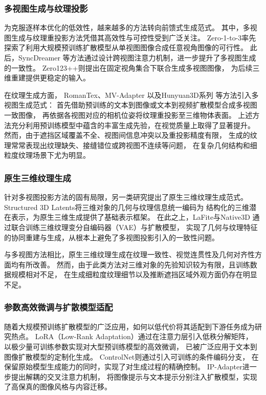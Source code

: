 \subsubsection{多视图生成与纹理投影}

为克服逐样本优化的低效性，越来越多的方法转向前馈式生成范式。
其中，多视图生成与纹理重投影方法凭借其高效性与可控性受到广泛关注。
Zero-1-to-3\cite{liu2023zero}率先探索了利用大规模预训练扩散模型从单视图图像合成任意视角图像的可行性。
此后，SyncDreamer\cite{liu2024syncdreamer}
等方法通过设计跨视图注意力机制，进一步提升了多视图生成的一致性。
Zero123++\cite{shi2023zero123++}则提出在固定视角集合下联合生成多视图图像，
为后续三维重建提供更稳定的输入。

在纹理生成方面，
RomanTex\cite{feng2025romantex}、MV-Adapter\cite{huang2025mv}
以及Hunyuan3D系列\cite{zhao2025hunyuan3d,lai2025hunyuan3d}
等方法引入多视图生成范式：
首先借助预训练的文本到图像或文本到视频扩散模型合成多视图一致图像，
再依据各视图对应的相机位姿将纹理重投影至三维物体表面。
上述方法充分利用预训练模型中蕴含的丰富生成先验，在视觉质量上取得了显著提升。
然而，由于遮挡区域覆盖不全、视图间信息冲突以及重投影精度有限，
生成的纹理常常表现出纹理缺失、接缝错位或跨视图不连续等问题\cite{cao2023texfusion}，
在复杂几何结构和细粒度纹理场景下尤为明显。

\subsubsection{原生三维纹理生成}

针对多视图投影方法的固有局限，另一类研究提出了原生三维纹理生成范式。
Structured 3D Latents\cite{xiang2025structured}将三维对象的几何与纹理信息统一编码为
结构化的三维潜在表示，为原生三维生成提供了基础表示框架。
在此之上，LaFite\cite{chen2025lafite}与Native3D\cite{xiang2025native}
通过联合训练三维纹理变分自编码器（VAE）与扩散模型，
实现了几何与纹理特征的协同重建与生成，从根本上避免了多视图投影引入的一致性问题。

与多视图方法相比，原生三维纹理生成在纹理一致性、视觉连贯性及几何对齐性方面均有所改善。
然而，由于此类方法对三维对象的先验知识较为有限，且训练数据规模相对不足，
在生成细粒度纹理细节以及推断遮挡区域外观方面仍存在明显不足。

\subsubsection{参数高效微调与扩散模型适配}

随着大规模预训练扩散模型的广泛应用，如何以低代价将其适配到下游任务成为研究热点。
LoRA（Low-Rank Adaptation）\cite{hu2022lora}通过在注意力层引入低秩分解矩阵，
以极少量可训练参数实现对大型预训练模型的高效微调，
已被广泛应用于文本到图像扩散模型的定制化生成\cite{ruiz2023dreambooth}。
ControlNet\cite{zhang2023adding}则通过引入可训练的条件编码分支，
在保留原始模型生成能力的同时，实现了对生成过程的精确控制。
IP-Adapter\cite{ye2023ip}进一步提出解耦的交叉注意力机制，
将图像提示与文本提示分别注入扩散模型，实现了高保真的图像风格与内容迁移。

